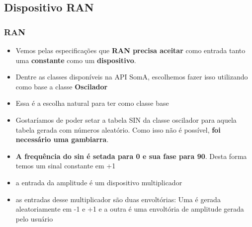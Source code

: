 \documentclass{beamer}
\begin{document}
\subsection{Dispositivo RAN}
\begin{frame}[fragile]
	\frametitle{RAN}
	\begin{itemize}
		\item Vemos pelas especificações que \textbf{RAN precisa aceitar} como entrada
		tanto uma \textbf{constante} como um \textbf{dispositivo}.
		\item Dentre as classes disponíveis na API SomA, escolhemos fazer isso utilizando como base a classe \textbf{Oscilador}
		\item Essa é a escolha natural para ter como classe base
		\item Gostaríamos de poder setar a tabela SIN da classe oscilador
		para aquela tabela gerada com números aleatório. Como isso não é possível,
		\textbf{foi necessário uma gambiarra}.
		\item \textbf{A frequência do sin é setada para 0 e sua fase para 90}. Desta forma temos um sinal constante em +1
		\item a entrada da amplitude é um dispositivo multiplicador
		\item as entradas desse multiplicador são duas envoltórias: Uma é gerada
		aleatoriamente em -1 e +1 e a outra é uma envoltória de amplitude gerada pelo usuário
	\end{itemize}
\end{frame}
\end{document}
